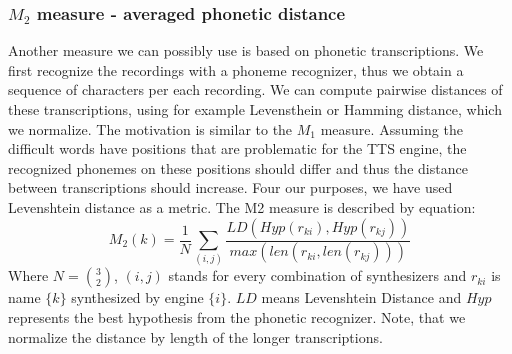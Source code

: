 \subsubsection{$M_2$ measure - averaged phonetic distance}
Another measure we can possibly use is based on phonetic transcriptions. We first recognize the recordings with a phoneme recognizer, thus we obtain a sequence of characters per each recording. We can compute pairwise distances of these transcriptions, using for example Levensthein \cite{navarro2001guided} or Hamming distance, which we normalize. The motivation is similar to the $M_1$ measure. Assuming the difficult words have positions that are problematic for the TTS engine, the recognized phonemes on these positions should differ and thus the distance between transcriptions should increase. Four our purposes, we have used Levenshtein distance as a metric.\linebreak
The M2 measure is described by equation:
\begin{equation}
M_2(k) = \frac{1}{N}\sum_{(i,j)}{\frac{LD(Hyp(r_{ki}),Hyp(r_{kj}))}{max(len(r_{ki},len(r_{kj})))}}
\end{equation}
Where $N = {3\choose2}$, $(i,j)$ stands for every combination of synthesizers and $r_{ki}$ is name $\{k\}$ synthesized by engine $\{i\}$. $LD$ means Levenshtein Distance and $Hyp$ represents the best hypothesis from the phonetic recognizer. Note, that we normalize the distance by length of the longer transcriptions.
